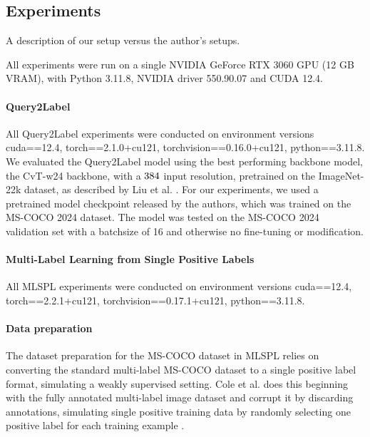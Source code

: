 \documentclass[lettersize,journal]{IEEEtran}
\begin{document}

\subsection{Experiments}
A description of our setup versus the author's setups.

\vspace{1em}

All experiments were run on a single NVIDIA GeForce RTX 3060 GPU (12 GB VRAM), with Python 3.11.8, NVIDIA driver 550.90.07 and CUDA 12.4. 


\paragraph{Query2Label}
All Query2Label experiments were conducted on environment versions cuda==12.4, torch==2.1.0+cu121, torchvision==0.16.0+cu121, python==3.11.8.
We evaluated the Query2Label model using the best performing backbone model, the CvT-w24 backbone, with a $384\time 384$ input resolution, pretrained on the ImageNet-22k dataset, as described by Liu et al. \cite{Query2Label}. For our experiments, we used a pretrained model checkpoint released by the authors, which was trained on the MS-COCO 2024 dataset. The model was tested on the MS-COCO 2024 validation set with a batchsize of 16 and otherwise no fine-tuning or modification.


\paragraph{Multi-Label Learning from Single Positive Labels}
All MLSPL experiments were conducted on environment versions cuda==12.4, torch==2.2.1+cu121, torchvision==0.17.1+cu121, python==3.11.8.
\paragraph{Data preparation}
The dataset preparation for the MS-COCO dataset in MLSPL relies on converting the standard multi-label MS-COCO dataset to a single positive label format, simulating a weakly supervised setting. Cole et al. does this beginning with the fully annotated multi-label image dataset and corrupt it by discarding annotations, simulating single positive training data by randomly selecting one positive label for each training example \cite{mlsp}.
\end{document}
